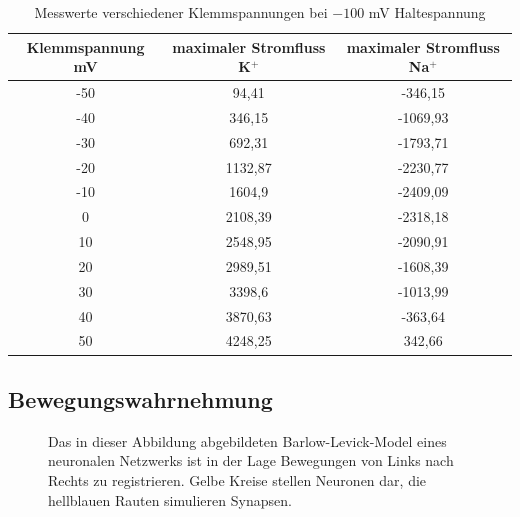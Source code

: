 \documentclass[11pt]{article}
\begin{document}
\begin{table}[H]
\caption{Messwerte verschiedener Klemmspannungen bei $-100$ mV Haltespannung}
\centering
\begin{adjustbox}{width=1.3\textwidth, center=\textwidth}
\begin{tabular}{c|c|c}
Klemmspannung mV & maximaler Stromfluss K$^+$ & maximaler Stromfluss Na$^+$\\
\hline\hline
-50	&	94,41	&	-346,15	\\
-40	&	346,15	&	-1069,93	\\
-30	&	692,31	&	-1793,71	\\
-20	&	1132,87	&	-2230,77	\\
-10	&	1604,9	&	-2409,09	\\
0	&	2108,39	&	-2318,18	\\
10	&	2548,95	&	-2090,91	\\
20	&	2989,51	&	-1608,39	\\
30	&	3398,6	&	-1013,99	\\
40	&	3870,63	&	-363,64	\\
50	&	4248,25	&	342,66	
\end{tabular}
\end{adjustbox}
\label{werte32}
\end{table}

\subsection{Bewegungswahrnehmung}
\begin{figure}[H]
\caption{Das in dieser Abbildung abgebildeten Barlow-Levick-Model eines neuronalen Netzwerks ist in der Lage Bewegungen von Links nach Rechts zu registrieren. Gelbe Kreise stellen Neuronen dar, die hellblauen Rauten simulieren Synapsen.}
\label{bar-lev}
\end{figure}
\end{document}
